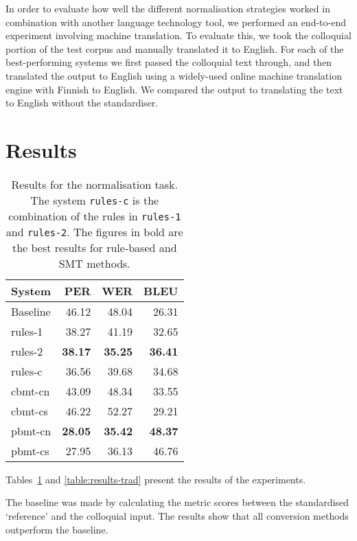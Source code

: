 \documentclass[11pt]{article}
\begin{document}
In order to evaluate how well the different normalisation strategies worked in 
combination with another language technology tool, we performed an end-to-end experiment
involving machine translation.
To evaluate this, we took the colloquial portion of the test corpus and manually 
translated it to English. For each of the best-performing systems we first passed
the colloquial text through, and then translated the output to English using
a widely-used online machine translation engine with Finnish to English. We compared
the output to translating the text to English without the standardiser. 

\section{Results}

\begin{table}
  \centering
  \begin{tabular}{|l|r|r|r|}
     \hline
    \textbf{System} & \textbf{PER} & \textbf{WER} & \textbf{BLEU} \\
     \hline
     Baseline & 46.12 & 48.04 & 26.31 \\
     \hline
     rules-1 & 38.27 & 41.19 & 32.65 \\
     rules-2 & \textbf{38.17} & \textbf{35.25} & \textbf{36.41} \\
     rules-c & 36.56 & 39.68 & 34.68 \\
     \hline
     {\sc cbmt}-cn & 43.09 & 48.34 & 33.55 \\
     {\sc cbmt}-cs & 46.22 & 52.27 & 29.21 \\
     {\sc pbmt}-cn & \textbf{28.05} & \textbf{35.42} & \textbf{48.37} \\
     {\sc pbmt}-cs & 27.95 & 36.13 & 46.76 \\
     \hline
  \end{tabular}
  \caption{Results for the normalisation task. The system \texttt{rules-c} is the combination
     of the rules in \texttt{rules-1} and \texttt{rules-2}. The figures in bold are the 
     best results for rule-based and SMT methods.}
  \label{table:results-norm}
\end{table}

Tables~\ref{table:results-norm} and \ref{table:results-trad} present the results of the experiments. 

The baseline was made by calculating the metric scores between the standardised `reference' 
and the colloquial input. The results show that all conversion methods outperform the baseline.
\end{document}
